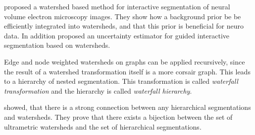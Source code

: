 \citet{straehle_2011_miccai} proposed a watershed based method for interactive segmentation
of neural volume electron  microscopy images.
They show how a background prior be be efficiently integrated into watersheds,
and that this prior is beneficial for neuro data.
In addition \citet{straehle_2012_cvpr} proposed an uncertainty estimator for
guided interactive segmentation based on watersheds.

\label{sec:rw_waterfall}

Edge and node weighted watersheds on graphs can be applied recursively, since
the result of a watershed transformation itself is a more corsair graph.
This leads to a hierarchy of nested segmentation.
This transformation is called \emph{waterfall transformation} \cite{beuchner_1994_waterfall} and
the hierarchy is called \emph{waterfall hierarchy}.

 showed, that there is a
strong connection between any hierarchical segmentations
and watersheds.
They prove that there exists a bijection between
the set of ultrametric watersheds\citep{najman_2010_corr} and the set of hierarchical segmentations.

